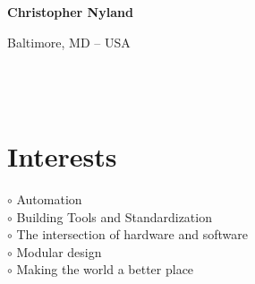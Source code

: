 \documentclass[a4paper,10pt]{article}
\begin{document}
\thispagestyle{empty}

\begin{adjustbox}{valign=t}
\begin{minipage}{0.3\textwidth} %
\begin{center}

\MySkip 	%

{\LARGE \bfseries Christopher Nyland}

\MySkip 	%

\textcolor{ColorTwo}{\faHome}
\textcolor{ColorTwo}{Baltimore, MD -- USA}\\

\textcolor{ColorTwo}{\faEnvelopeO}
 \\

\textcolor{ColorTwo}{\faGithub} \\

\textcolor{ColorTwo}{\faChain}
 \\
\end{center}

\vfill

\section*{Interests}
\raggedright
\textcolor{ColorOne}{$\circ$} Automation\\
\textcolor{ColorOne}{$\circ$} Building Tools and Standardization\\
\textcolor{ColorOne}{$\circ$} The intersection of hardware and software\\
\textcolor{ColorOne}{$\circ$} Modular design\\
\textcolor{ColorOne}{$\circ$} Making the world a better place\\


\end{minipage}
\end{adjustbox}
\end{document}
